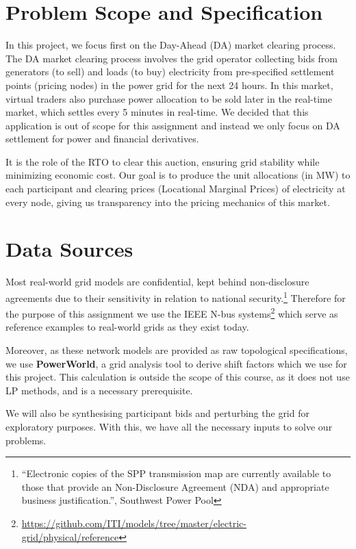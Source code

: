 \documentclass[11pt]{article}
\begin{document}
\newpage
\tableofcontents
\newpage

\section{Problem Scope and Specification}
In this project, we focus first on the Day-Ahead (DA) market clearing process. The DA market clearing process involves the grid operator collecting bids from generators (to sell) and loads (to buy) electricity from pre-specified settlement points (pricing nodes) in the power grid for the next 24 hours. In this market, virtual traders also purchase power allocation to be sold later in the real-time market, which settles every 5 minutes in real-time. We decided that this application is out of scope for this assignment and instead we only focus on DA settlement for power and financial derivatives.

It is the role of the RTO to clear this auction, ensuring grid stability while minimizing economic cost. Our goal is to produce the unit allocations (in MW) to each participant and clearing prices (Locational Marginal Prices) of electricity at every node, giving us transparency into the pricing mechanics of this market.

\section{Data Sources}
Most real-world grid models are confidential, kept behind non-disclosure agreements due to their sensitivity in relation to national security.\footnote{``Electronic copies of the SPP transmission map are currently available to those that provide an Non-Disclosure Agreement (NDA) and appropriate business justification.'', Southwest Power Pool} Therefore for the purpose of this assignment we use the IEEE N-bus systems\footnote{\url{https://github.com/ITI/models/tree/master/electric-grid/physical/reference}} which serve as reference examples to real-world grids as they exist today.

Moreover, as these network models are provided as raw topological specifications, we use \textbf{PowerWorld}, a grid analysis tool to derive shift factors which we use for this project. This calculation is outside the scope of this course, as it does not use LP methods, and is a necessary prerequisite.

We will also be synthesising participant bids and perturbing the grid for exploratory purposes. With this, we have all the necessary inputs to solve our problems.
\end{document}
